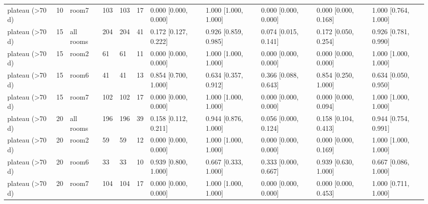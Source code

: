 \begin{tabular}{lllllllllll}
plateau (>70 d) & 10 & room7 & 103 & 103 & 17 & 0.000 [0.000, 0.000] & 1.000 [1.000, 1.000] & 0.000 [0.000, 0.000] & 0.000 [0.000, 0.168] & 1.000 [0.764, 1.000] \\
plateau (>70 d) & 15 & all rooms & 204 & 204 & 41 & 0.172 [0.127, 0.222] & 0.926 [0.859, 0.985] & 0.074 [0.015, 0.141] & 0.172 [0.050, 0.254] & 0.926 [0.781, 0.990] \\
plateau (>70 d) & 15 & room2 & 61 & 61 & 11 & 0.000 [0.000, 0.000] & 1.000 [1.000, 1.000] & 0.000 [0.000, 0.000] & 0.000 [0.000, 0.000] & 1.000 [1.000, 1.000] \\
plateau (>70 d) & 15 & room6 & 41 & 41 & 13 & 0.854 [0.700, 1.000] & 0.634 [0.357, 0.912] & 0.366 [0.088, 0.643] & 0.854 [0.250, 1.000] & 0.634 [0.050, 0.950] \\
plateau (>70 d) & 15 & room7 & 102 & 102 & 17 & 0.000 [0.000, 0.000] & 1.000 [1.000, 1.000] & 0.000 [0.000, 0.000] & 0.000 [0.000, 0.094] & 1.000 [1.000, 1.000] \\
plateau (>70 d) & 20 & all rooms & 196 & 196 & 39 & 0.158 [0.112, 0.211] & 0.944 [0.876, 1.000] & 0.056 [0.000, 0.124] & 0.158 [0.104, 0.413] & 0.944 [0.754, 0.991] \\
plateau (>70 d) & 20 & room2 & 59 & 59 & 12 & 0.000 [0.000, 0.000] & 1.000 [1.000, 1.000] & 0.000 [0.000, 0.000] & 0.000 [0.000, 0.169] & 1.000 [1.000, 1.000] \\
plateau (>70 d) & 20 & room6 & 33 & 33 & 10 & 0.939 [0.800, 1.000] & 0.667 [0.333, 1.000] & 0.333 [0.000, 0.667] & 0.939 [0.630, 1.000] & 0.667 [0.086, 1.000] \\
plateau (>70 d) & 20 & room7 & 104 & 104 & 17 & 0.000 [0.000, 0.000] & 1.000 [1.000, 1.000] & 0.000 [0.000, 0.000] & 0.000 [0.000, 0.453] & 1.000 [0.711, 1.000] \\
\hline
\end{tabular}
